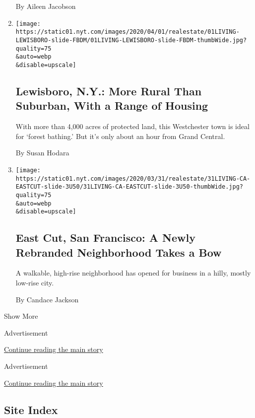 \begin{enumerate}
  By Aileen Jacobson
\item
  \href{/2020/04/01/realestate/lewisboro-ny-more-rural-than-suburban-with-a-range-of-housing.html}{}

  \texttt{[image: https://static01.nyt.com/images/2020/04/01/realestate/01LIVING-LEWISBORO-slide-FBDM/01LIVING-LEWISBORO-slide-FBDM-thumbWide.jpg?quality=75\\\&auto=webp\\\&disable=upscale]}

  \hypertarget{lewisboro-ny-more-rural-than-suburban-with-a-range-of-housing}{%
  \subsection{Lewisboro, N.Y.: More Rural Than Suburban, With a Range of
  Housing}\label{lewisboro-ny-more-rural-than-suburban-with-a-range-of-housing}}

  With more than 4,000 acres of protected land, this Westchester town is
  ideal for `forest bathing.' But it's only about an hour from Grand
  Central.

  By Susan Hodara
\item
  \href{/2020/03/31/realestate/east-cut-san-francisco-a-newly-rebranded-neighborhood-takes-a-bow.html}{}

  \texttt{[image: https://static01.nyt.com/images/2020/03/31/realestate/31LIVING-CA-EASTCUT-slide-3U50/31LIVING-CA-EASTCUT-slide-3U50-thumbWide.jpg?quality=75\\\&auto=webp\\\&disable=upscale]}

  \hypertarget{east-cut-san-francisco-a-newly-rebranded-neighborhood-takes-a-bow}{%
  \subsection{East Cut, San Francisco: A Newly Rebranded Neighborhood
  Takes a
  Bow}\label{east-cut-san-francisco-a-newly-rebranded-neighborhood-takes-a-bow}}

  A walkable, high-rise neighborhood has opened for business in a hilly,
  mostly low-rise city.

  By Candace Jackson
\end{enumerate}

Show More

Advertisement

\protect\hyperlink{after-mid1}{Continue reading the main story}

Advertisement

\protect\hyperlink{after-mktg}{Continue reading the main story}

\hypertarget{site-index}{%
\subsection{Site Index}\label{site-index}}

